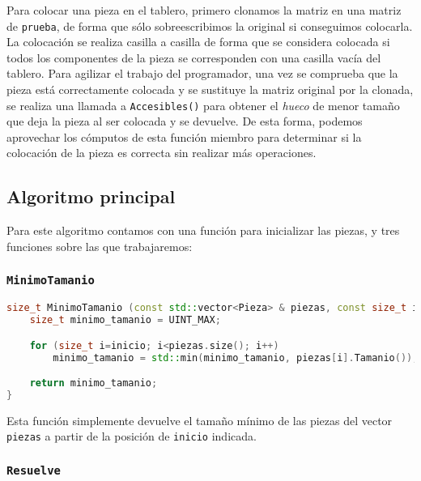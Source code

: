 Para colocar una pieza en el tablero, primero clonamos la matriz en una matriz de \texttt{prueba}, de forma que sólo sobreescribimos la original si conseguimos colocarla.
La colocación se realiza casilla a casilla de forma que se considera colocada si todos los componentes de la pieza se corresponden con una casilla vacía del tablero.
Para agilizar el trabajo del programador, una vez se comprueba que la pieza está correctamente colocada y se sustituye la matriz original por la clonada, se realiza una llamada a \texttt{Accesibles()} para obtener el \textit{hueco} de menor tamaño que deja la pieza al ser colocada y se devuelve.
De esta forma, podemos aprovechar los cómputos de esta función miembro para determinar si la colocación de la pieza es correcta sin realizar más operaciones.

\subsection{Algoritmo principal}\label{grafos-implementacion-algoritmo}

Para este algoritmo contamos con una función para inicializar las piezas, y tres funciones sobre las que trabajaremos:

\subsubsection{\texttt{MinimoTamanio}}\label{grafos-implementacion-algoritmo-minimotamanio}

\begin{lstlisting}[language=C++]
size_t MinimoTamanio (const std::vector<Pieza> & piezas, const size_t inicio) {
	size_t minimo_tamanio = UINT_MAX;

	for (size_t i=inicio; i<piezas.size(); i++)
		minimo_tamanio = std::min(minimo_tamanio, piezas[i].Tamanio());

	return minimo_tamanio;
}
\end{lstlisting}

Esta función simplemente devuelve el tamaño mínimo de las piezas del vector \texttt{piezas} a partir de la posición de \texttt{inicio} indicada.

\pagebreak

\subsubsection{\texttt{Resuelve}}\label{grafos-implementacion-algoritmo-resuelve}

